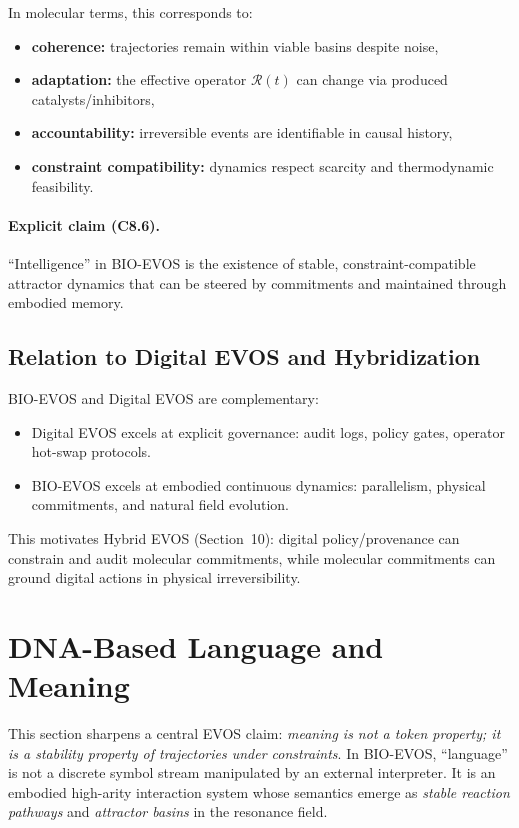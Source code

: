\documentclass[11pt]{article}
\begin{document}
In molecular terms, this corresponds to:
\begin{itemize}
  \item \textbf{coherence:} trajectories remain within viable basins despite noise,
  \item \textbf{adaptation:} the effective operator $\mathcal{R}(t)$ can change via produced catalysts/inhibitors,
  \item \textbf{accountability:} irreversible events are identifiable in causal history,
  \item \textbf{constraint compatibility:} dynamics respect scarcity and thermodynamic feasibility.
\end{itemize}

\paragraph{Explicit claim (C8.6).}
``Intelligence'' in BIO-EVOS is the existence of stable, constraint-compatible attractor
dynamics that can be steered by commitments and maintained through embodied memory.

\subsection{Relation to Digital EVOS and Hybridization}
\label{sec:relation-digital-hybrid}

BIO-EVOS and Digital EVOS are complementary:
\begin{itemize}
  \item Digital EVOS excels at explicit governance: audit logs, policy gates, operator hot-swap protocols.
  \item BIO-EVOS excels at embodied continuous dynamics: parallelism, physical commitments, and natural field evolution.
\end{itemize}

This motivates Hybrid EVOS (Section~10): digital policy/provenance can constrain and
audit molecular commitments, while molecular commitments can ground digital actions in
physical irreversibility.

\section{DNA-Based Language and Meaning}
\label{sec:dna-language-meaning}

This section sharpens a central EVOS claim: \emph{meaning is not a token property; it is a
stability property of trajectories under constraints}. In BIO-EVOS, ``language'' is not
a discrete symbol stream manipulated by an external interpreter. It is an embodied
high-arity interaction system whose semantics emerge as \emph{stable reaction pathways}
and \emph{attractor basins} in the resonance field.
\end{document}
